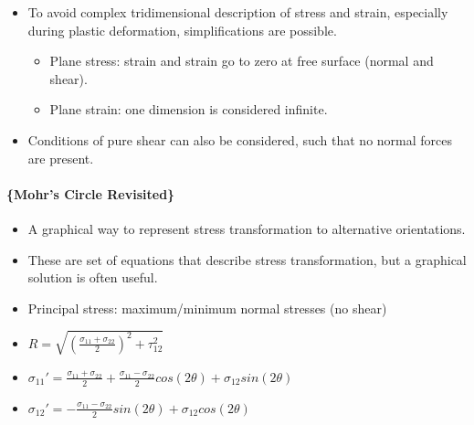 \documentclass[
]{article}
\providecommand{\tightlist}{%
  \setlength{\itemsep}{0pt}\setlength{\parskip}{0pt}}
\begin{document}
\begin{itemize}
\tightlist
\item
  To avoid complex tridimensional description of stress and strain,
  especially during plastic deformation, simplifications are possible.

  \begin{itemize}
  \tightlist
  \item
    Plane stress: strain and strain go to zero at free surface (normal
    and shear).
  \item
    Plane strain: one dimension is considered infinite.
  \end{itemize}
\item
  Conditions of pure shear can also be considered, such that no normal
  forces are present.
\end{itemize}

\hypertarget{mohrs-circle-revisited}{%
\paragraph{\{Mohr's Circle Revisited\}}\label{mohrs-circle-revisited}}

\begin{itemize}
\tightlist
\item
  A graphical way to represent stress transformation to alternative
  orientations.
\item
  These are set of equations that describe stress transformation, but a
  graphical solution is often useful.
\end{itemize}

{}

\begin{itemize}
\tightlist
\item
  Principal stress: maximum/minimum normal stresses (no shear)
\end{itemize}

{}

\begin{itemize}
\tightlist
\item
  \(R = \sqrt{(\frac{\sigma_{11} + \sigma_{22}}{2})^{2} + \tau_{12}^{2}}\)
\item
  \(\sigma_{11}' = \frac{\sigma_{11} + \sigma_{22}}{2} + \frac{\sigma_{11} - \sigma_{22}}{2}cos(2\theta) + \sigma_{12}sin(2\theta)\)
\item
  \(\sigma_{12}' = -\frac{\sigma_{11} - \sigma_{22}}{2}sin(2\theta) + \sigma_{12}cos(2\theta)\)
\end{itemize}
\end{document}
